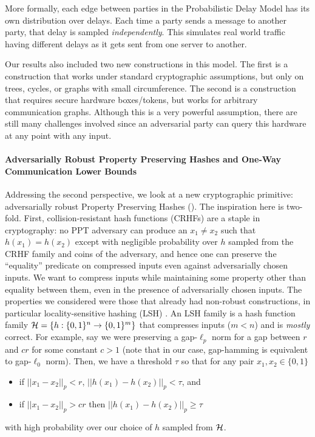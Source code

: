 \begin{itemize}
	More formally, each edge between parties in the Probabilistic Delay Model has its own distribution over delays. Each time a party sends a message to another party, that delay is sampled \emph{independently}. This simulates real world traffic having different delays as it gets sent from one server to another.
	
	Our results also included two new constructions in this model. The first is a construction that works under standard cryptographic assumptions, but only on trees, cycles, or graphs with small circumference. The second is a construction that requires secure hardware boxes/tokens, but works for arbitrary communication graphs. Although this is a very powerful assumption, there are still many challenges involved since an adversarial party can query this hardware at any point with any input.
\end{itemize}

\paragraph{Adversarially Robust Property Preserving Hashes and One-Way Communication Lower Bounds}
Addressing the second perspective, we look at a new cryptographic primitive: adversarially robust Property Preserving Hashes (\PPH). The inspiration here is two-fold. First, collision-resistant hash functions (CRHFs) are a staple in cryptography: no PPT adversary can produce an $x_1 \neq x_2$ such that $h(x_1) = h(x_2)$ except with negligible probability over $h$ sampled from the CRHF family and coins of the adversary, and hence one can preserve the ``equality'' predicate on compressed inputs even against adversarially chosen inputs. We want to compress inputs while maintaining some property other than equality between them, even in the presence of adversarially chosen inputs. The properties we considered were those that already had non-robust constructions, in particular locality-sensitive hashing (LSH) \cite{IndykM98}. An LSH family is a hash function family ${\cal H} = \{ h:\{0,1\}^n \to \{0,1\}^m \}$ that compresses inputs ($m < n$) and is \emph{mostly} correct. For example, say we were preserving a gap-$\ell_p$ norm for a gap between $r$ and $cr$ for some constant $c > 1$ (note that in our case, gap-hamming is equivalent to gap-$\ell_0$ norm). Then, we have a threshold $\tau$ so that for any pair $x_1, x_2 \in \{0,1\}$
\begin{itemize}
	\item if $||x_1 - x_2||_p < r$, $||h(x_1) - h(x_2)||_p < \tau$, and
	\item if $||x_1 - x_2||_p > cr$ then $||h(x_1) - h(x_2)||_p \ge \tau$
\end{itemize}
with high probability over our choice of $h$ sampled from ${\cal H}$.

